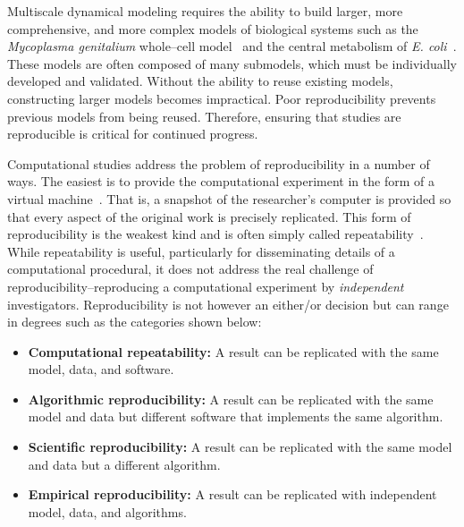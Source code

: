 \documentclass[10pt,letterpaper]{article}
\begin{document}
Multiscale dynamical modeling requires the ability to build larger, more comprehensive, and more complex models of biological systems such as the \textit{Mycoplasma genitalium} whole--cell model~\cite{karr2012whole} and the central metabolism of \textit{E. coli}~\cite{millard2017metabolic}. These models are often composed of many submodels, which must be individually developed and validated. Without the ability to reuse existing models, constructing larger models becomes impractical. Poor reproducibility prevents previous models from being reused. Therefore, ensuring that studies are reproducible is critical for continued progress.

Computational studies address the problem of reproducibility in a number of ways. The easiest is to provide the computational experiment in the form of a virtual machine~\cite{piccolo2016tools}. That is, a snapshot of the researcher's computer is provided so that every aspect of the original work is precisely replicated. This form of reproducibility is the weakest kind and is often simply called repeatability~\cite{drummond2009replicability}. While repeatability is useful, particularly for disseminating details of a computational procedural, it does not address the real challenge of reproducibility--reproducing a computational experiment by {\em independent} investigators. Reproducibility is not however an either/or decision but can range in degrees such as the categories shown below:

\begin{itemize}
\item \textbf{Computational repeatability:} A result can be replicated with the same model, data, and software.
\item \textbf{Algorithmic reproducibility:} A result can be replicated with the same model and data but different software that implements the same algorithm.
\item \textbf{Scientific reproducibility:} A result can be replicated with the same model and data but a different algorithm.
\item \textbf{Empirical reproducibility:} A result can be replicated with independent model, data, and algorithms.
\end{itemize}
\end{document}
